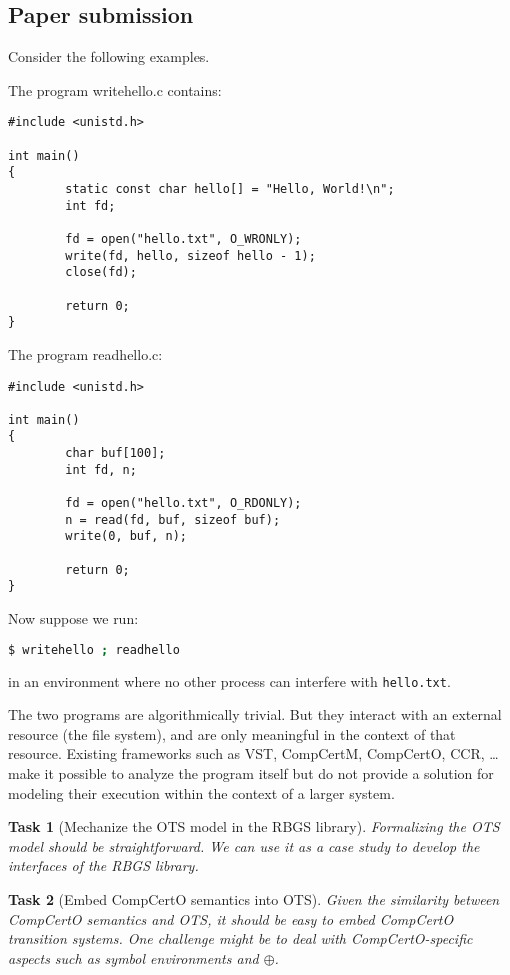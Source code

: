 \documentclass{article}
\newtheorem{task}{Task}
\begin{document}

\newpage
\subsection{Paper submission} %

Consider the following examples.

The program writehello.c contains:
\begin{lstlisting}
#include <unistd.h>

int main()
{
        static const char hello[] = "Hello, World!\n";
        int fd;

        fd = open("hello.txt", O_WRONLY);
        write(fd, hello, sizeof hello - 1);
        close(fd);

        return 0;
}
\end{lstlisting}

The program readhello.c:
\begin{lstlisting}
#include <unistd.h>

int main()
{
        char buf[100];
        int fd, n;

        fd = open("hello.txt", O_RDONLY);
        n = read(fd, buf, sizeof buf);
        write(0, buf, n);

        return 0;
}
\end{lstlisting}

Now suppose we run:
\begin{lstlisting}[language=sh]
$ writehello ; readhello
\end{lstlisting}
in an environment where no other process can interfere with \texttt{hello.txt}.

The two programs are algorithmically trivial.
But they interact with an external resource (the file system),
and are only meaningful in the context of that resource.
Existing frameworks such as
VST, CompCertM, CompCertO, CCR, \ldots
make it possible to analyze the program itself
but do not provide a solution for
modeling their execution within the context of a larger system.

\begin{task}[Mechanize the OTS model in the RBGS library]
Formalizing the OTS model should be straightforward.
We can use it as a case study to develop the interfaces of the RBGS library.
\end{task}

\begin{task}[Embed CompCertO semantics into OTS]
Given the similarity between CompCertO semantics and OTS,
it should be easy to embed CompCertO transition systems.
One challenge might be to deal with CompCertO-specific aspects
such as symbol environments and $\oplus$.
\end{task}
\end{document}
